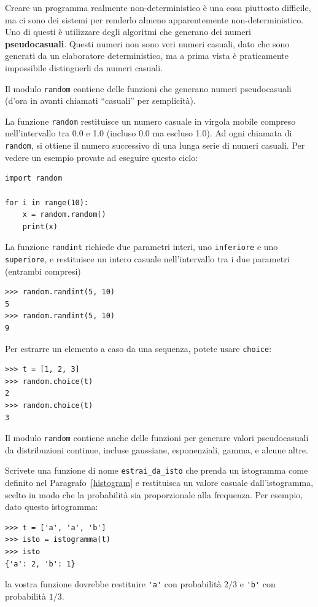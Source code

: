 \documentclass[10pt]{book}
\begin{document}
Creare un programma realmente non-deterministico è una cosa piuttosto difficile, ma ci sono dei sistemi per renderlo almeno apparentemente non-deterministico. Uno di questi è utilizzare degli algoritmi che generano dei numeri {\bf pseudocasuali}. Questi numeri non sono veri numeri casuali, dato che sono generati da un elaboratore deterministico, ma a prima vista è praticamente impossibile distinguerli da numeri casuali.

Il modulo {\tt random} contiene delle funzioni che generano numeri pseudocasuali (d'ora in avanti chiamati ``casuali'' per semplicità).

La funzione {\tt random} restituisce un numero casuale in virgola mobile compreso nell'intervallo tra 0.0 e 1.0 (incluso 0.0 ma escluso 1.0).  Ad ogni chiamata di {\tt random}, si ottiene il numero successivo di una lunga serie di numeri casuali. Per vedere un esempio provate ad eseguire questo ciclo:

\begin{verbatim}
import random

for i in range(10):
    x = random.random()
    print(x)
\end{verbatim}
%
La funzione {\tt randint} richiede due parametri interi, uno  {\tt inferiore} e uno  {\tt superiore}, e restituisce un intero casuale nell'intervallo tra i due parametri (entrambi compresi)

\begin{verbatim}
>>> random.randint(5, 10)
5
>>> random.randint(5, 10)
9
\end{verbatim}
%
Per estrarre un elemento a caso da una sequenza, potete usare
{\tt choice}:

\begin{verbatim}
>>> t = [1, 2, 3]
>>> random.choice(t)
2
>>> random.choice(t)
3
\end{verbatim}
%
Il modulo {\tt random} contiene anche delle funzioni per generare valori pseudocasuali da distribuzioni continue, incluse gaussiane, esponenziali, gamma, e alcune altre.

\vspace{0.2in}
\begin{exercise}

Scrivete una funzione di nome \verb"estrai_da_isto" che prenda un istogramma come definito nel Paragrafo~\ref{histogram} e restituisca un valore casuale dall'istogramma, scelto in modo che la probabilità sia proporzionale alla frequenza. Per esempio, dato questo istogramma:

\begin{verbatim}
>>> t = ['a', 'a', 'b']
>>> isto = istogramma(t)
>>> isto
{'a': 2, 'b': 1}
\end{verbatim}
%
la vostra funzione dovrebbe restituire \verb"'a'" con probabilità $2/3$ e \verb"'b'" con probabilità $1/3$.
\end{exercise}
\end{document}

